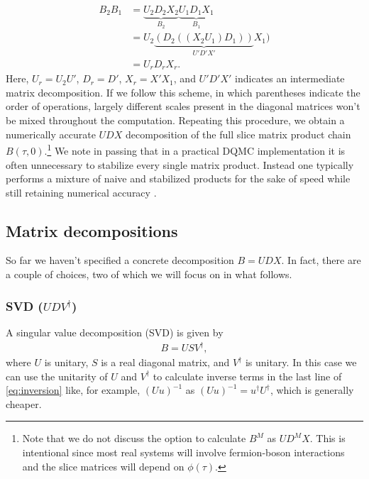 \documentclass[submission, Phys]{SciPost}
\begin{document}
\begin{align}
	B_2 B_1 &= \underbrace{U_2 D_2 X_2}_{B_2}\underbrace{U_1 D_1 X_1}_{B_1} \nonumber\\
	&= U_2 \underbrace{(D_2 ((X_2 U_1) D_1))}_{U' D' X'} X_1)\\
	&= U_r D_r X_r. \nonumber
\end{align}
Here, $U_r = U_2 U'$, $D_r = D'$, $X_r = X' X_1$, and $U'D'X'$ indicates an intermediate matrix decomposition. If we follow this scheme, in which parentheses indicate the order of operations, largely different scales present in the diagonal matrices won't be mixed throughout the computation. Repeating this procedure, we obtain a numerically accurate $UDX$ decomposition of the full slice matrix product chain $B(\tau, 0)$.\footnote{Note that we do not discuss the option to calculate $B^M$ as $U D^M X$. This is intentional since most real systems will involve fermion-boson interactions and the slice matrices will depend on $\phi(\tau)$.} We note in passing that in a practical DQMC implementation it is often unnecessary to stabilize every single matrix product. Instead one typically performs a mixture of naive and stabilized products for the sake of speed while still retaining numerical accuracy \cite{Assaad2002a}.

\subsection{Matrix decompositions}

So far we haven't specified a concrete decomposition ${B = UDX}$. In fact, there are a couple of choices, two of which we will focus on in what follows.

\subsubsection{SVD ($UDV^\dagger$)}
A singular value decomposition (SVD) is given by
\begin{align}
	B = USV^\dagger,
\end{align}
where $U$ is unitary, $S$ is a real diagonal matrix, and $V^\dagger$ is unitary. In this case we can use the unitarity of $U$ and $V^\dagger$ to calculate inverse terms in the last line of \ref{eq:inversion} like, for example, $(Uu)^{-1}$ as $(Uu)^{-1} = u^\dagger U^\dagger$, which is generally cheaper.
\end{document}
